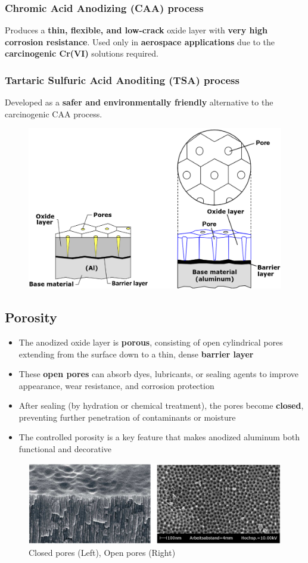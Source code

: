 \documentclass{article}
\begin{document}
\subsubsection{Chromic Acid Anodizing (CAA) process}
Produces a \textbf{thin, flexible, and low-crack} oxide layer with \textbf{very high corrosion resistance}.
Used only in \textbf{aerospace applications} due to the \textbf{carcinogenic Cr(VI)} solutions required.

\subsubsection{Tartaric Sulfuric Acid Anoditing (TSA) process}
Developed as a \textbf{safer and environmentally friendly} alternative to the carcinogenic CAA process.
\begin{figure}[ht!]
  \centering
  \includegraphics[width=.75\textwidth]{media/anodizing.png}
\end{figure}


\newpage
\subsection{Porosity}
\begin{itemize}
  \item The anodized oxide layer is \textbf{porous}, consisting of open cylindrical pores extending from the surface down to a thin, dense \textbf{barrier layer}
  \item These \textbf{open pores} can absorb dyes, lubricants, or sealing agents to improve appearance, wear resistance, and corrosion protection
  \item After sealing (by hydration or chemical treatment), the pores become \textbf{closed}, preventing further penetration of contaminants or moisture
  \item The controlled porosity is a key feature that makes anodized aluminum both functional and decorative
\end{itemize}
\begin{figure}[ht!]
  \centering
  \includegraphics[width=.8\textwidth]{media/porosity.png}
  \caption*{Closed pores (Left), Open pores (Right)}
\end{figure}
\end{document}
